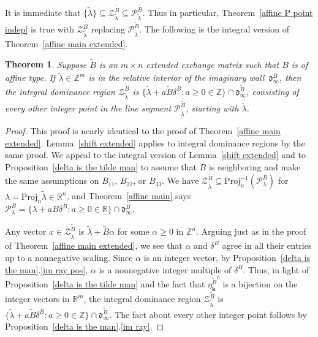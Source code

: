 \documentclass[10pt]{article}
\newtheorem{theorem}[proposition]{Theorem}
\theoremstyle{definition}
\theoremstyle{remark}
\numberwithin{equation}{section}
\newcommand{\integers}{\mathbb Z}
\newcommand{\reals}{\mathbb R}
\newcommand{\set}[1]{{\lbrace #1 \rbrace}}
\newcommand{\0}{{\mathbf{0}}}
\newcommand{\Proj}{\mathrm{Proj}}
\newcommand{\kk}{{\boldsymbol{k}}}
\newcommand{\tB}{{\widetilde{B}}}
\renewcommand{\P}{\mathcal{P}}
\newcommand{\IP}{\mathcal{Z}}
\renewcommand{\d}{{\mathfrak d}}
\begin{document}
It is immediate that $\set{\tilde\lambda}\subseteq\IP^\tB_{\tilde\lambda}\subseteq\P^\tB_{\tilde\lambda}$.   
Thus in particular, Theorem~\ref{affine P point indep} is true with $\IP_{\tilde\lambda}^\tB$ replacing $\P_{\tilde\lambda}^\tB$.
The following is the integral version of Theorem~\ref{affine main extended}.

\begin{theorem}\label{affine main integral}  
  Suppose $\tB$ is an $m\times n$ extended exchange matrix such that $B$ is of affine type.
  If $\tilde\lambda\in\integers^m$ is in the relative interior of the imaginary wall~$\d^\tB_\infty$, then the integral dominance region $\IP^\tB_{\tilde\lambda}$ is $\set{\tilde\lambda+a\tB\delta^B:a\ge0\in\integers}\cap\d^\tB_\infty$, consisting of every other integer point in the line segment $\P^\tB_{\tilde\lambda}$, starting with $\tilde\lambda$.
\end{theorem}

\begin{proof}
This proof is nearly identical to the proof of Theorem~\ref{affine main extended}.
Lemma~\ref{shift extended} applies to integral dominance regions by the same proof.
We appeal to the integral version of Lemma~\ref{shift extended} and to Proposition~\ref{delta is the tilde man} to assume that $B$ is neighboring and make the same assumptions on $B_{11}$, $B_{22}$, or $B_{33}$.
  We have $\IP_{\tilde\lambda}^\tB\subseteq\Proj_n^{-1}(\P_{\lambda}^B)$ for $\lambda=\Proj_n\tilde\lambda\in\reals^n$, and Theorem~\ref{affine main} says $\P_{\lambda}^B=\set{\lambda+aB\delta^B:a\ge0\in\reals}\cap\d^B_\infty$.

Any vector $x\in\IP_{\tilde\lambda}^\tB$ is $\tilde\lambda+\tB\alpha$ for some $\alpha\ge0$ in $\integers^n$.
Arguing just as in the proof of Theorem~\ref{affine main extended}, we see that $\alpha$ and $\delta^B$ agree in all their entries up to a nonnegative scaling.
Since $\alpha$ is an integer vector, by Proposition~\ref{delta is the man}.\ref{im ray pos}, $\alpha$ is a nonnegative integer multiple of $\delta^B$.
Thus, in light of Proposition~\ref{delta is the tilde man} and the fact that $\eta^{\tB^T}_\kk$ is a bijection on the integer vectors in $\reals^m$, the integral dominance region $\IP^\tB_{\tilde\lambda}$ is $\set{\tilde\lambda+a\tB\delta^B:a\ge0\in\integers}\cap\d^\tB_\infty$.
The fact about every other integer point follows by Proposition~\ref{delta is the man}.\ref{im ray}.
\end{proof}
\end{document}
